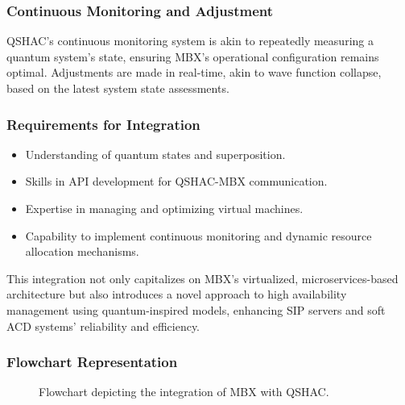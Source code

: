 \documentclass[12pt]{article}
\begin{document}
\subsubsection{Continuous Monitoring and Adjustment}

QSHAC's continuous monitoring system is akin to repeatedly measuring a quantum system's state, ensuring MBX's operational configuration remains optimal. Adjustments are made in real-time, akin to wave function collapse, based on the latest system state assessments.

\subsubsection{Requirements for Integration}

\begin{itemize}
    \item Understanding of quantum states and superposition.
    \item Skills in API development for QSHAC-MBX communication.
    \item Expertise in managing and optimizing virtual machines.
    \item Capability to implement continuous monitoring and dynamic resource allocation mechanisms.
\end{itemize}

This integration not only capitalizes on MBX's virtualized, microservices-based architecture but also introduces a novel approach to high availability management using quantum-inspired models, enhancing SIP servers and soft ACD systems' reliability and efficiency.

\subsubsection{Flowchart Representation}

\begin{figure}[ht]
\centering
{}
\caption{Flowchart depicting the integration of MBX with QSHAC.}
\end{figure}
\end{document}
